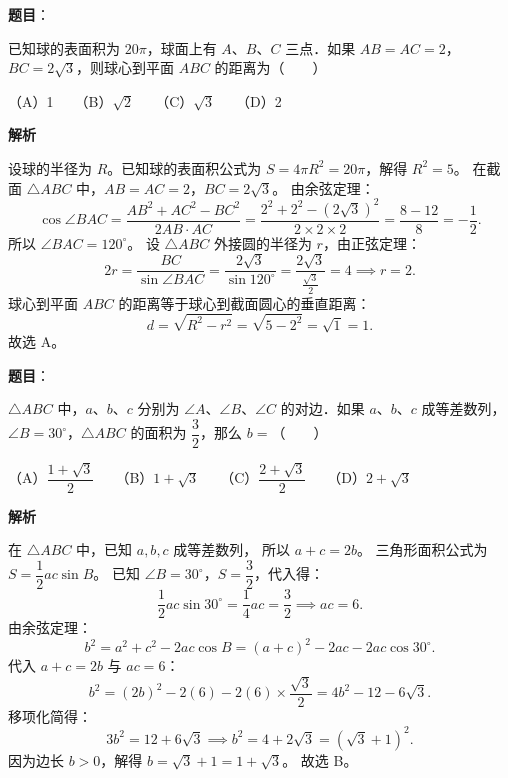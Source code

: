 \begin{answer}

\textbf{题目}：

已知球的表面积为 $20\pi$，球面上有 $A$、$B$、$C$ 三点．如果 $AB=AC=2$，$BC=2\sqrt{3}$，则球心到平面 $ABC$ 的距离为\mbox{（　　）}

（A）1　　（B）$\sqrt{2}$　　（C）$\sqrt{3}$　　（D）2

\textbf{解析}

设球的半径为 $R$。已知球的表面积公式为 $S=4\pi R^2=20\pi$，解得 $R^2=5$。
在截面 $\triangle ABC$ 中，$AB=AC=2$，$BC=2\sqrt{3}$。
由余弦定理：
\nopagebreak[4]
\[
\cos\angle BAC=\frac{AB^2+AC^2-BC^2}{2AB\cdot AC}=\frac{2^2+2^2-(2\sqrt{3})^2}{2\times 2\times 2}=\frac{8-12}{8}=-\frac{1}{2}.
\]
所以 $\angle BAC=120^\circ$。
设 $\triangle ABC$ 外接圆的半径为 $r$，由正弦定理：
\nopagebreak[4]
\[
2r=\frac{BC}{\sin\angle BAC}=\frac{2\sqrt{3}}{\sin 120^\circ}=\frac{2\sqrt{3}}{\frac{\sqrt{3}}{2}}=4\implies r=2.
\]
球心到平面 $ABC$ 的距离等于球心到截面圆心的垂直距离：
\nopagebreak[4]
\[
d=\sqrt{R^2-r^2}=\sqrt{5-2^2}=\sqrt{1}=1.
\]
故选 A。


\end{answer}
\begin{answer}

\textbf{题目}：

$\triangle ABC$ 中，$a$、$b$、$c$ 分别为 $\angle A$、$\angle B$、$\angle C$ 的对边．如果 $a$、$b$、$c$ 成等差数列，$\angle B=30^\circ$，$\triangle ABC$ 的面积为 $\dfrac{3}{2}$，那么 $b=$\mbox{（　　）}

（A）$\dfrac{1+\sqrt{3}}{2}$　　（B）$1+\sqrt{3}$　　（C）$\dfrac{2+\sqrt{3}}{2}$　　（D）$2+\sqrt{3}$

\textbf{解析}

在 $\triangle ABC$ 中，已知 $a,b,c$ 成等差数列，
所以 $a+c=2b$。
三角形面积公式为 $S=\dfrac{1}{2}ac\sin B$。
已知 $\angle B=30^\circ$，$S=\dfrac{3}{2}$，代入得：
\nopagebreak[4]
\[
\frac{1}{2}ac\sin 30^\circ=\frac{1}{4}ac=\frac{3}{2}\implies ac=6.
\]
由余弦定理：
\nopagebreak[4]
\[
b^2=a^2+c^2-2ac\cos B=(a+c)^2-2ac-2ac\cos 30^\circ.
\]
代入 $a+c=2b$ 与 $ac=6$：
\nopagebreak[4]
\[
b^2=(2b)^2-2(6)-2(6)\times\frac{\sqrt{3}}{2}=4b^2-12-6\sqrt{3}.
\]
移项化简得：
\nopagebreak[4]
\[
3b^2=12+6\sqrt{3}\implies b^2=4+2\sqrt{3}=(\sqrt{3}+1)^2.
\]
因为边长 $b>0$，解得 $b=\sqrt{3}+1=1+\sqrt{3}$。
故选 B。


\end{answer}
